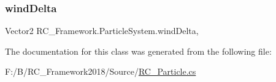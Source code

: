 \subsubsection{\texorpdfstring{wind\+Delta}{windDelta}}
{\footnotesize\ttfamily Vector2 R\+C\+\_\+\+Framework.\+Particle\+System.\+wind\+Delta\hspace{0.3cm}{\ttfamily [get]}, {\ttfamily [set]}}



The documentation for this class was generated from the following file\+:\begin{DoxyCompactItemize}
\item 
F\+:/\+B/\+R\+C\+\_\+\+Framework2018/\+Source/\mbox{\hyperlink{_r_c___particle_8cs}{R\+C\+\_\+\+Particle.\+cs}}\end{DoxyCompactItemize}
